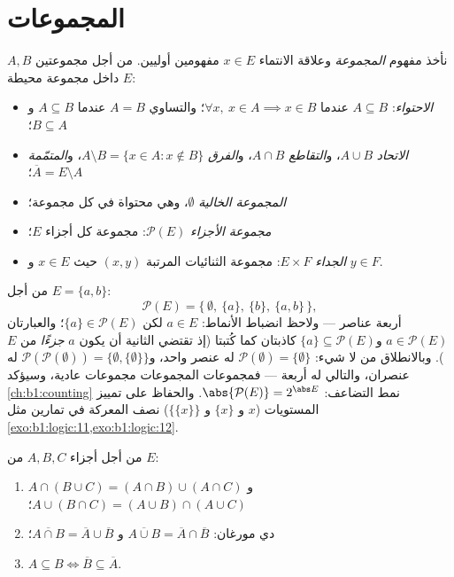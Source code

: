 \section{المجموعات}

\begin{definition}\label{def:b1:logic:sets}
نأخذ مفهوم \emph{المجموعة} وعلاقة الانتماء
$x \in E$ مفهومين أوليين. من أجل مجموعتين $A, B$ داخل مجموعة محيطة $E$:
\begin{itemize}
  \item \emph{الاحتواء}: $A \subseteq B$ عندما $\forall x,\ x \in A
        \implies x \in B$؛ والتساوي $A = B$ عندما $A \subseteq B$ و
        $B \subseteq A$؛
  \item \emph{الاتحاد} $A \cup B$، و\emph{التقاطع} $A \cap B$،
        و\emph{الفرق} $A \setminus B = \{x \in A : x \notin B\}$،
        و\emph{المتمّمة} $\overline{A} = E \setminus A$؛
  \item \emph{المجموعة الخالية} $\emptyset$، وهي محتواة في كل
        مجموعة؛
  \item \emph{مجموعة الأجزاء}
        $\mathcal{P}(E)$: مجموعة كل أجزاء $E$؛
  \item \emph{الجداء} $E \times F$: مجموعة الثنائيات المرتبة
        $(x, y)$ حيث $x \in E$ و $y \in F$.
\end{itemize}
\end{definition}

\begin{example}\label{ex:b1:logic:powerset}
من أجل $E = \{a, b\}$:
\[
\mathcal P(E) = \bigl\{\, \emptyset,\ \{a\},\ \{b\},\ \{a, b\}
\,\bigr\},
\]
أربعة عناصر --- ولاحظ انضباط الأنماط: $a \in E$ لكن
$\{a\} \in \mathcal P(E)$؛ والعبارتان $a \in \mathcal P(E)$
و$\{a\} \subseteq \mathcal P(E)$ كاذبتان كما كُتبتا
(إذ تقتضي الثانية أن يكون $a$ \emph{جزءًا} من $E$).
وبالانطلاق من لا شيء: $\mathcal P(\emptyset) = \{\emptyset\}$
له عنصر واحد، و$\mathcal P(\mathcal P(\emptyset)) = \{\emptyset,
\{\emptyset\}\}$ له عنصران، والتالي له أربعة --- فمجموعات
المجموعات مجموعات عادية، وسيؤكد \cref{ch:b1:counting} نمط
التضاعف: $\abs{\mathcal P(E)} = 2^{\abs E}$. والحفاظ على تمييز
المستويات ($x$ و $\{x\}$ و $\{\{x\}\}$) نصف المعركة في تمارين
مثل \cref{exo:b1:logic:11,exo:b1:logic:12}.
\end{example}

\begin{proposition}\label{prop:b1:logic:setalgebra}
من أجل أجزاء $A, B, C$ من $E$:
\begin{enumerate}
  \item $A \cap (B \cup C) = (A \cap B) \cup (A \cap C)$ و
        $A \cup (B \cap C) = (A \cup B) \cap (A \cup C)$؛
  \item دي مورغان: $\overline{A \cup B} = \overline{A} \cap
        \overline{B}$ و $\overline{A \cap B} = \overline{A} \cup
        \overline{B}$؛
  \item $A \subseteq B \iff \overline{B} \subseteq \overline{A}$.
\end{enumerate}
\end{proposition}

